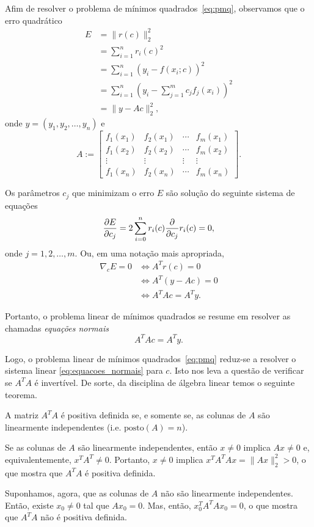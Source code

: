 Afim de resolver o problema de mínimos quadrados~\eqref{eq:pmq}, observamos que o erro quadrático
\begin{align*}
  E &= \|r(c)\|_2^2 \\
    &= \sum_{i=1}^n r_i(c)^2 \\
    &= \sum_{i=1}^n \left(y_i - f(x_i;c)\right)^2 \\
    &= \sum_{i=1}^n \left(y_i - \sum_{j=1}^m c_jf_j(x_i)\right)^2 \\
    &= \|y - Ac\|_2^2,
\end{align*}
onde $y = (y_1, y_2, \dotsc, y_n)$ e
\begin{equation}
  A :=
  \begin{bmatrix}
    f_1(x_1) & f_2(x_1) & \cdots & f_m(x_1) \\
    f_1(x_2) & f_2(x_2) & \cdots & f_m(x_2) \\
    \vdots & \vdots & \vdots & \vdots \\
    f_1(x_n) & f_2(x_n) & \cdots & f_m(x_n)
  \end{bmatrix}.
\end{equation}

Os parâmetros $c_j$ que minimizam o erro $E$ são solução do seguinte sistema de equações
\begin{equation}
  \frac{\partial E}{\partial c_j} = 2\sum_{i=0}^n r_i(c)\frac{\partial}{\partial c_j}r_i(c) = 0,
\end{equation}
onde $j=1, 2, \dotsc, m$. Ou, em uma notação mais apropriada,
\begin{align}
  \nabla_c E = 0 &\Leftrightarrow A^Tr(c) = 0\\
  &\Leftrightarrow A^T(y - Ac) = 0\\
  &\Leftrightarrow A^TAc = A^Ty.
\end{align}

Portanto, o problema linear de mínimos quadrados se resume em resolver as chamadas \emph{equações normais}
\begin{equation}\label{eq:equacoes_normais}
  A^TAc= A^Ty.
\end{equation}

Logo, o problema linear de mínimos quadrados~\eqref{eq:pmq} reduz-se a resolver o sistema linear \eqref{eq:equacoes_normais} para $c$. Isto nos leva a questão de verificar se $A^TA$ é invertível. De sorte, da disciplina de álgebra linear temos o seguinte teorema.

\begin{teo}
  A matriz $A^TA$ é positiva definida se, e somente se, as colunas de $A$ são linearmente independentes (i.e. $\text{posto}(A)=n$).
\end{teo}
\begin{dem}
  Se as colunas de $A$ são linearmente independentes, então $x\neq 0$ implica $Ax\neq 0$ e, equivalentemente, $x^TA^T\neq 0$. Portanto, $x\neq 0$ implica $x^TA^TAx = \|Ax\|_2^2 > 0$, o que mostra que $A^TA$ é positiva definida.

  Suponhamos, agora, que as colunas de $A$ não são linearmente independentes. Então, existe $x_0\neq 0$ tal que $Ax_0 = 0$. Mas, então, $x_0^TA^TAx_0=0$, o que mostra que $A^TA$ não é positiva definida. 
\end{dem}

